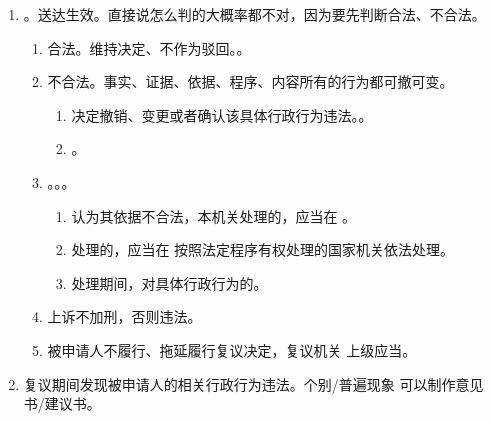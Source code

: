 \begin{enumerate}
\begin{enumerate}
\begin{enumerate}
                \end{enumerate}
          \item 改变原行政行为。只要不撤回照审不误。。
          \item 和解、调解。同诉讼。复议决定作出前自愿达成和解协议 \yjt 复议终止。
          \item 撤回。再次复议不受理，但可去起诉。例外。胁迫。。
        \end{enumerate}
  \item {}。送达生效。直接说怎么判的大概率都不对，因为要先判断合法、不合法。
        \begin{enumerate}
          \item 合法。维持决定、不作为驳回。。
          \item 不合法。事实、证据、依据、程序、内容所有的行为都可撤可变。
                \begin{enumerate}
                  \item 决定撤销、变更或者确认该具体行政行为违法。。
                  \item {}。
                \end{enumerate}
          \item {}。。。
                \begin{enumerate}
                  \item 认为其依据不合法，本机关处理的，应当在 。
                  \item {}处理的，应当在 按照法定程序有权处理的国家机关依法处理。
                  \item 处理期间，对具体行政行为的。
                \end{enumerate}
          \item 上诉不加刑，否则违法。
          \item 被申请人不履行、拖延履行复议决定，复议机关 \hz 上级应当。
        \end{enumerate}
  \item 复议期间发现被申请人的相关行政行为违法。个别/普遍现象 \yjt 可以制作意见书/建议书。
\end{enumerate}
